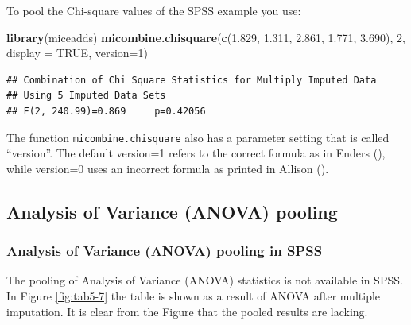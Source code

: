 \documentclass[]{book}
\newenvironment{Shaded}{\begin{snugshade}}{\end{snugshade}}
\newcommand{\KeywordTok}[1]{\textcolor[rgb]{0.13,0.29,0.53}{\textbf{#1}}}
\newcommand{\DataTypeTok}[1]{\textcolor[rgb]{0.13,0.29,0.53}{#1}}
\newcommand{\DecValTok}[1]{\textcolor[rgb]{0.00,0.00,0.81}{#1}}
\newcommand{\FloatTok}[1]{\textcolor[rgb]{0.00,0.00,0.81}{#1}}
\newcommand{\OtherTok}[1]{\textcolor[rgb]{0.56,0.35,0.01}{#1}}
\newcommand{\NormalTok}[1]{#1}
\begin{document}
To pool the Chi-square values of the SPSS example you use:

\begin{Shaded}
\begin{Highlighting}[]
\KeywordTok{library}\NormalTok{(miceadds)}
\KeywordTok{micombine.chisquare}\NormalTok{(}\KeywordTok{c}\NormalTok{(}\FloatTok{1.829}\NormalTok{, }\FloatTok{1.311}\NormalTok{, }\FloatTok{2.861}\NormalTok{, }\FloatTok{1.771}\NormalTok{, }\FloatTok{3.690}\NormalTok{), }\DecValTok{2}\NormalTok{, }\DataTypeTok{display =} \OtherTok{TRUE}\NormalTok{, }\DataTypeTok{version=}\DecValTok{1}\NormalTok{)}
\end{Highlighting}
\end{Shaded}

\begin{verbatim}
## Combination of Chi Square Statistics for Multiply Imputed Data
## Using 5 Imputed Data Sets
## F(2, 240.99)=0.869     p=0.42056
\end{verbatim}

The function \texttt{micombine.chisquare} also has a parameter setting
that is called ``version''. The default version=1 refers to the correct
formula as in Enders (\citet{enders2010applied}), while version=0 uses
an incorrect formula as printed in Allison (\citet{Allison2002}).

\subsection{Analysis of Variance (ANOVA)
pooling}\label{analysis-of-variance-anova-pooling}

\subsubsection{Analysis of Variance (ANOVA) pooling in
SPSS}\label{analysis-of-variance-anova-pooling-in-spss}

The pooling of Analysis of Variance (ANOVA) statistics is not available
in SPSS. In Figure \ref{fig:tab5-7} the table is shown as a result of
ANOVA after multiple imputation. It is clear from the Figure that the
pooled results are lacking.
\end{document}
